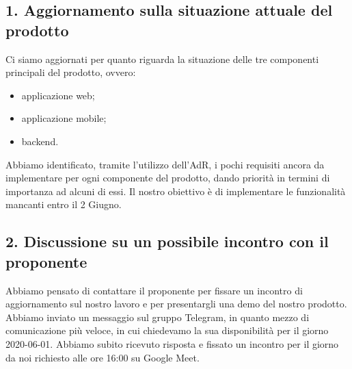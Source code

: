 \subsection*{\hypertarget{link1}{1. Aggiornamento sulla situazione attuale del prodotto}}
Ci siamo aggiornati per quanto riguarda la situazione delle tre componenti principali del prodotto, ovvero:
\begin{itemize}
	\item applicazione web;
	\item applicazione mobile;
	\item backend.
\end{itemize}
Abbiamo identificato, tramite l'utilizzo dell'AdR, i pochi requisiti ancora da implementare per ogni componente del prodotto, dando priorità in termini di importanza ad alcuni di essi.
Il nostro obiettivo è di implementare le funzionalità mancanti entro il 2 Giugno.
\subsection*{\hypertarget{link2}{2. Discussione su un possibile incontro con il proponente}}
Abbiamo pensato di contattare il proponente per fissare un incontro di aggiornamento sul nostro lavoro e per presentargli una demo del nostro prodotto.
Abbiamo inviato un messaggio sul gruppo Telegram, in quanto mezzo di comunicazione più veloce, in cui chiedevamo la sua disponibilità per il giorno 2020-06-01.
Abbiamo subito ricevuto risposta e fissato un incontro per il giorno da noi richiesto alle ore 16:00 su Google Meet.

